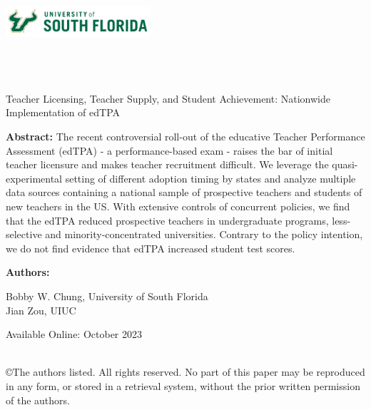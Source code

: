\documentclass[11pt]{article}
\begin{document}
\onehalfspacing

\noindent \includegraphics[width = 0.4\textwidth]{USouthFlorida-lightbg-2c-rgb-h.png} \\

\noindent{\color{usfgreen} \rule{0.5\textwidth}{10pt}}{\color{usfgold} \rule{0.5\textwidth}{10pt}}\\

 \\
 \\

\vspace*{0.5in}

\begin{center} 
    \huge Teacher Licensing, Teacher Supply, and Student Achievement: Nationwide Implementation of edTPA
\end{center}

\vspace*{0.5in}

\noindent \textbf{Abstract:} The recent controversial roll-out of the educative Teacher Performance Assessment (edTPA) - a performance-based exam - raises the bar of initial teacher licensure and makes teacher recruitment difficult. We leverage the quasi-experimental setting of different adoption timing by states and analyze multiple data sources containing a national sample of prospective teachers and students of new teachers in the US. With extensive controls of concurrent policies, we find that the edTPA reduced prospective teachers in undergraduate programs, less-selective and minority-concentrated universities. Contrary to the policy intention, we do not find evidence that edTPA increased student test scores.

\vspace*{0.25in}

\noindent \textbf{Authors:}

Bobby W. Chung, University of South Florida \\
\indent Jian Zou, UIUC

\vspace*{0.25in}


\noindent Available Online: October 2023 %

\vfill 
\noindent{\color{usfgreen} \rule{\textwidth}{5pt}}\\
\noindent \small ©The authors listed. All rights reserved. No part of this paper may be reproduced in any form, or stored in a retrieval system, without the prior written permission of the authors.
\thispagestyle{empty}
\end{document}
